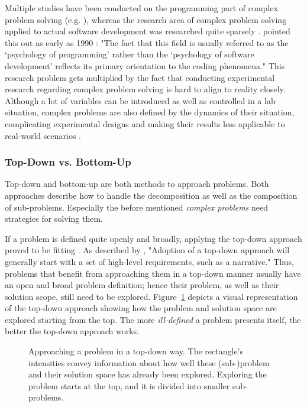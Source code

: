 Multiple studies have been conducted on the programming part of complex problem solving (e.g. \cite{lawan_what_2019, gibson_software_2005, robertson_role_2008, taheri_evaluating_2015}), whereas the research area of complex problem solving applied to actual software development was researched quite sparsely \cite{wingo_using_2015}.
\citeauthor{curtis_psychology_1990} pointed this out as early as 1990 \cite{curtis_psychology_1990}: "The fact that this field is usually referred to as the `psychology of programming' rather than the `psychology of software development' reflects its primary orientation to the coding phenomena."
This research problem gets multiplied by the fact that conducting experimental research regarding complex problem solving is hard to align to reality closely.
Although a lot of variables can be introduced as well as controlled in a lab situation, complex problems are also defined by the dynamics of their situation, complicating experimental designs and making their results less applicable to real-world scenarios \cite{lawan_what_2019}.


\subsubsection{Top-Down vs. Bottom-Up}
Top-down and bottom-up are both methods to approach problems.
Both approaches describe how to handle the decomposition as well as the composition of sub-problems.
Especially the before mentioned \emph{complex problems} need strategies for solving them.

If a problem is defined quite openly and broadly, applying the top-down approach proved to be fitting \cite{kung_comparing_2013}.
As described by \citeauthor{kung_comparing_2013} \cite{kung_comparing_2013}, "Adoption of a top-down approach will generally start with a set of high-level requirements, such as a narrative."
Thus, problems that benefit from approaching them in a top-down manner usually have an open and broad problem definition; hence their problem, as well as their solution scope, still need to be explored.
Figure~\ref{fig:top-down} depicts a visual representation of the top-down approach showing how the problem and solution space are explored starting from the top.
The more \emph{ill-defined} a problem presents itself, the better the top-down approach works.
%
\begin{figure}
\centering
\hspace*{0.15\linewidth}

\caption{Approaching a problem in a top-down way. The rectangle's intensities convey information about how well these (sub-)problem and their solution space has already been explored. Exploring the problem starts at the top, and it is divided into smaller sub-problems.}
\label{fig:top-down}
\end{figure}

